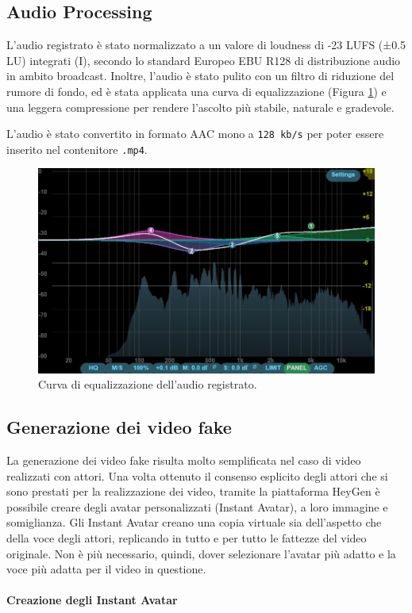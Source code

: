 \subsection{Audio Processing}

L'audio registrato è stato normalizzato a un valore di loudness di -23 LUFS (±0.5 LU) integrati (I), secondo lo standard Europeo EBU R128 di distribuzione audio in ambito broadcast. Inoltre, l'audio è stato pulito con un filtro di riduzione del rumore di fondo, ed è stata applicata una curva di equalizzazione (Figura \ref{fig:eq_curve}) e una leggera compressione per rendere l'ascolto più stabile, naturale e gradevole.

L'audio è stato convertito in formato AAC mono a \verb|128 kb/s| per poter essere inserito nel contenitore \verb|.mp4|.

\begin{figure}[t]
    \centering
    \includegraphics[width=0.62\linewidth]{images/eq_curve}
    \caption{Curva di equalizzazione dell'audio registrato.}
    \label{fig:eq_curve}
\end{figure}

\subsection{Generazione dei video fake}

La generazione dei video fake risulta molto semplificata nel caso di video realizzati con attori. Una volta ottenuto il consenso esplicito degli attori che si sono prestati per la realizzazione dei video, tramite la piattaforma HeyGen è possibile creare degli avatar personalizzati (Instant Avatar), a loro immagine e somiglianza. Gli Instant Avatar creano una copia virtuale sia dell'aspetto che della voce degli attori, replicando in tutto e per tutto le fattezze del video originale. Non è più necessario, quindi, dover selezionare l'avatar più adatto e la voce più adatta per il video in questione.

\paragraph{Creazione degli Instant Avatar}

